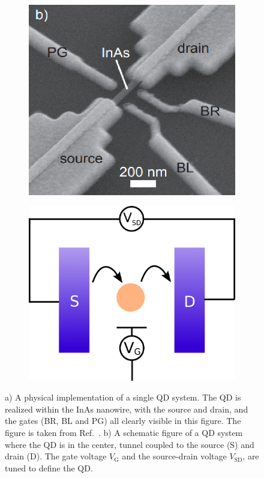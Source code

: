 \documentclass[../main.tex]{subfiles}
\begin{document}
\begin{figure}[t!]
\centering
\begin{subfigure}[t]{.5\textwidth}
  \centering
  \includegraphics[width=.8\linewidth]{figures/qdotsem.png}
  \caption{}
  \label{fig:sem}
\end{subfigure}%
\begin{subfigure}[t]{.5\textwidth}
  \centering
  \includegraphics[width=.9\linewidth]{figures/qdotschematic.png}
  \caption{}
  \label{fig:qdotscheme}
\end{subfigure}
\caption{a) A physical implementation of a single QD system. The QD is realized within the InAs nanowire, with the source and drain, and the gates (BR, BL and PG) all clearly visible in this figure. The figure is taken from Ref.~\cite{sven}. b) A schematic figure of a QD system where the QD is in the center, tunnel coupled to the source (S) and drain (D). The gate voltage $V_\text{G}$ and the source-drain voltage $V_\text{SD}$, are tuned to define the QD.}
\label{fig:qdot}
\end{figure}
\end{document}
